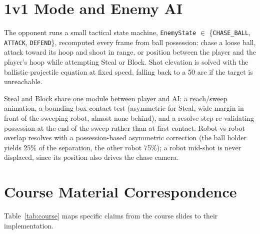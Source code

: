 \documentclass[11pt,a4paper]{article}
\newcommand{\code}[1]{\texttt{#1}}
\begin{document}
\section{1v1 Mode and Enemy AI}
\label{sec:ai}

The opponent runs a small tactical state machine, \code{EnemyState} $\in$ \{\code{CHASE\_BALL}, \code{ATTACK}, \code{DEFEND}\}, recomputed every frame from ball possession: chase a loose ball, attack toward its hoop and shoot in range, or position between the player and the player's hoop while attempting Steal or Block. Shot elevation is solved with the ballistic-projectile equation at fixed speed, falling back to a 50\textdegree{} arc if the target is unreachable.

Steal and Block share one module between player and AI: a reach/sweep animation, a bounding-box contact test (asymmetric for Steal, wide margin in front of the sweeping robot, almost none behind), and a resolve step re-validating possession at the end of the sweep rather than at first contact. Robot-vs-robot overlap resolves with a possession-based asymmetric correction (the ball holder yields 25\% of the separation, the other robot 75\%); a robot mid-shot is never displaced, since its position also drives the chase camera.

\section{Course Material Correspondence}
\label{sec:course}

Table~\ref{tab:course} maps specific claims from the course slides to their implementation.
\end{document}
